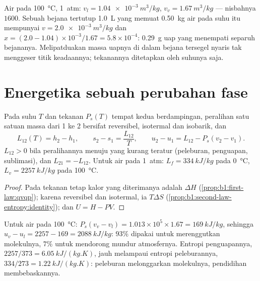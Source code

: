 \begin{example}\label{ex:b1:phase-changes:lever}
Air pada \qty{100}{\degreeCelsius}, \qty{1}{atm}: $v_l = \qty{1.04e-3}{m^3/kg}$,
$v_v = \qty{1.67}{m^3/kg}$ --- nisbahnya $1600$. Sebuah bejana tertutup \qty{1.0}{L}
yang memuat \qty{0.50}{kg} air pada suhu itu mempunyai $v =
\qty{2.0e-3}{m^3/kg}$ dan $x = (2.0 - 1.04) \times 10^{-3}/1.67 = 5.8 \times 10^{-4}$:
\qty{0.29}{g} uap yang menempati separuh bejananya. Melipatduakan massa
uapnya di dalam bejana tersegel nyaris tak menggeser titik keadaannya; tekanannya
ditetapkan oleh suhunya saja.
\end{example}

\section{Energetika sebuah perubahan fase}

\begin{proposition}\label{prop:b1:phase-changes:latent}
Pada suhu $T$ dan tekanan $P_s(T)$ tempat kedua  berdampingan,
peralihan satu satuan massa dari  1 ke  2 bersifat reversibel,
isotermal dan isobarik, dan
\[
L_{12}(T) = h_2 - h_1 , \qquad s_2 - s_1 = \frac{L_{12}}{T} , \qquad
u_2 - u_1 = L_{12} - P_s(v_2 - v_1) .
\]
$L_{12} > 0$ bila peralihannya menuju  yang kurang teratur (peleburan,
penguapan, sublimasi), dan $L_{21} = -L_{12}$. Untuk air pada \qty{1}{atm}:
$L_f = \qty{334}{kJ/kg}$ pada \qty{0}{\degreeCelsius}, $L_v = \qty{2257}{kJ/kg}$ pada
\qty{100}{\degreeCelsius}.
\end{proposition}

\begin{proof}
Pada tekanan tetap kalor yang diterimanya adalah $\Delta H$
(\cref{prop:b1:first-law:qvqp}); karena reversibel dan isotermal, ia
$T\Delta S$ (\cref{prop:b1:second-law-entropy:identity}); dan $U = H - PV$.
\end{proof}

\begin{example}\label{ex:b1:phase-changes:whereheat}
Untuk air pada \qty{100}{\degreeCelsius}: $P_s(v_v - v_l) = 1.013 \times 10^5 \times
1.67 = \qty{169}{kJ/kg}$, sehingga $u_v - u_l = 2257 - 169 = \qty{2088}{kJ/kg}$:
$93\%$  dipakai untuk merenggutkan molekulnya, $7\%$
untuk mendorong mundur atmosfernya. Entropi penguapannya,
$2257/373 = \qty{6.05}{kJ/(kg.K)}$, jauh melampaui entropi peleburannya, $334/273 =
\qty{1.22}{kJ/(kg.K)}$: peleburan melonggarkan molekulnya, pendidihan membebaskannya.
\end{example}

